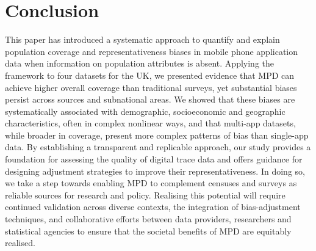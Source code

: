 \documentclass[]{rsos}%
\begin{document}
\section{Conclusion}\label{conclusion}

This paper has introduced a systematic approach to quantify and explain
population coverage and representativeness biases in mobile phone application data
when information on population attributes is absent. Applying the
framework to four datasets for the UK, we presented evidence that MPD
can achieve higher overall coverage than traditional surveys, yet
substantial biases persist across sources and subnational areas. We
showed that these biases are systematically associated with demographic,
socioeconomic and geographic characteristics, often in complex nonlinear
ways, and that multi-app datasets, while broader in coverage, present
more complex patterns of bias than single-app data. By establishing a
transparent and replicable approach, our study provides a foundation for
assessing the quality of digital trace data and offers guidance for
designing adjustment strategies to improve their representativeness. In
doing so, we take a step towards enabling MPD to complement censuses and
surveys as reliable sources for research and policy. Realising this
potential will require continued validation across diverse contexts, the
integration of bias-adjustment techniques, and collaborative efforts
between data providers, researchers and statistical agencies to ensure
that the societal benefits of MPD are equitably realised.










\end{document}
